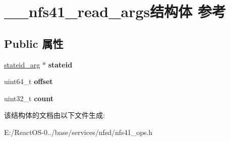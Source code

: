 \hypertarget{struct____nfs41__read__args}{}\section{\+\_\+\+\_\+nfs41\+\_\+read\+\_\+args结构体 参考}
\label{struct____nfs41__read__args}
\subsection*{Public 属性}
\begin{DoxyCompactItemize}
\item 
\mbox{\label{struct____nfs41__read__args_a4d659d348e062150fb66e338fb2920e4}} 
\hyperlink{struct____stateid__arg}{stateid\+\_\+arg} $\ast$ {\bfseries stateid}
\item 
\mbox{\label{struct____nfs41__read__args_ab1adc365c17be1119dd618e8199b4c4e}} 
uint64\+\_\+t {\bfseries offset}
\item 
\mbox{\label{struct____nfs41__read__args_a6d9cfeaaa3c56650d8efdfd581f73be8}} 
uint32\+\_\+t {\bfseries count}
\end{DoxyCompactItemize}


该结构体的文档由以下文件生成\+:\begin{DoxyCompactItemize}
\item 
E\+:/\+React\+O\+S-\/0../base/services/nfsd/nfs41\+\_\+ops.\+h\end{DoxyCompactItemize}
